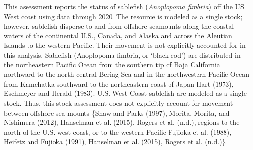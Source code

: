 \documentclass[11pt,
  english,
  a4paper,
]{article}
\begin{document}
This assessment reports the status of sablefish (\emph{Anoplopoma fimbria}) off the US West coast using data through 2020. The resource is modeled as a single stock; however, sablefish disperse to and from offshore seamounts along the coastal waters of the continental U.S., Canada, and Alaska and across the Aleutian Islands to the western Pacific. Their movement is not explicitly accounted for in this analysis. Sablefish (Anoplopoma fimbria, or `black cod') are distributed in the northeastern Pacific Ocean from the southern tip of Baja California northward to the north-central Bering Sea and in the northwestern Pacific Ocean from Kamchatka southward to the northeastern coast of Japan {Hart (1973)\leavevmode\tagmcend\tagstructend}, {Eschmeyer and Herald (1983)\leavevmode\tagmcend\tagstructend}. U.S. West Coast sablefish are modeled as a single stock. Thus, this stock assessment does not explicitly account for movement between offshore sea mounts \{{Shaw and Parks (1997)\leavevmode\tagmcend\tagstructend}, {Morita, Morita, and Nishimura (2012)\leavevmode\tagmcend\tagstructend}, {Hanselman et al. (2015)\leavevmode\tagmcend\tagstructend}, {Rogers et al. (n.d.)\leavevmode\tagmcend\tagstructend}, regions to the north of the U.S. west coast, or to the western Pacific {Fujioka et al. (1988)\leavevmode\tagmcend\tagstructend}, {Heifetz and Fujioka (1991)\leavevmode\tagmcend\tagstructend}, {Hanselman et al. (2015)\leavevmode\tagmcend\tagstructend}, {Rogers et al. (n.d.)\leavevmode\tagmcend\tagstructend}\}.

\leavevmode\tagmcend\tagstructend\par

\end{document}
